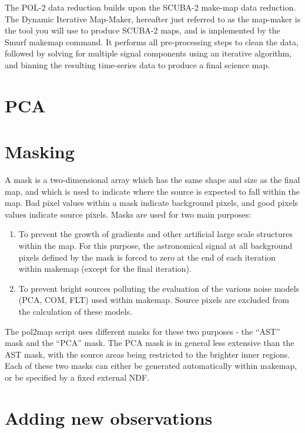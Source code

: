 The POL-2 data reduction builds upon the SCUBA-2 make-map data reduction. The Dynamic Iterative Map-Maker, hereafter just referred to as the map-maker is the tool you will use to produce SCUBA-2 maps, and is implemented by the Smurf makemap command. It performs all pre-processing steps to clean the data, followed by solving for multiple signal components using an iterative algorithm, and binning the resulting time-series data to produce a final science map. 



\cite{smurf}

\section{PCA}


\section{Masking}
A mask is a two-dimensional array which has the same shape and size as the final map, and
which is used to indicate where the source is expected to fall within the map. Bad pixel values
within a mask indicate background pixels, and good pixels values indicate source pixels. Masks
are used for two main purposes:

\begin{enumerate}\itemsep-0.2em
\item To prevent the growth of gradients and other artificial large scale structures within the
map.  For this purpose, the astronomical signal at all background pixels defined by the
mask is forced to zero at the end of each iteration within makemap (except for the final iteration).
\item To prevent bright sources polluting the evaluation of the various noise models (PCA, COM, FLT) used within
makemap. Source pixels are excluded from the calculation of these models.
\end{enumerate}


The pol2map script uses different masks for these two purposes - the “AST” mask and the “PCA” mask. 
The PCA mask is in general less extensive than the AST mask, with the source areas being restricted to the brighter inner regions.
Each of these two masks can either be generated automatically within makemap, or be specified by
a fixed external NDF. 

\section{Adding new observations}




